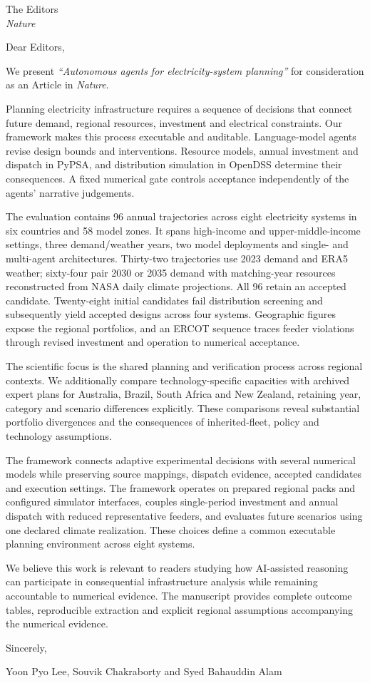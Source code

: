 \documentclass[10pt]{letter}
\begin{document}
\begin{letter}{The Editors\\\textit{Nature}}
\opening{Dear Editors,}

We present \textit{``Autonomous agents for electricity-system planning''} for consideration as an Article in \textit{Nature}.

Planning electricity infrastructure requires a sequence of decisions that connect future demand, regional resources, investment and electrical constraints. Our framework makes this process executable and auditable. Language-model agents revise design bounds and interventions. Resource models, annual investment and dispatch in PyPSA, and distribution simulation in OpenDSS determine their consequences. A fixed numerical gate controls acceptance independently of the agents' narrative judgements.

The evaluation contains 96 annual trajectories across eight electricity systems in six countries and 58 model zones. It spans high-income and upper-middle-income settings, three demand/weather years, two model deployments and single- and multi-agent architectures. Thirty-two trajectories use 2023 demand and ERA5 weather; sixty-four pair 2030 or 2035 demand with matching-year resources reconstructed from NASA daily climate projections. All 96 retain an accepted candidate. Twenty-eight initial candidates fail distribution screening and subsequently yield accepted designs across four systems. Geographic figures expose the regional portfolios, and an ERCOT sequence traces feeder violations through revised investment and operation to numerical acceptance.

The scientific focus is the shared planning and verification process across regional contexts. We additionally compare technology-specific capacities with archived expert plans for Australia, Brazil, South Africa and New Zealand, retaining year, category and scenario differences explicitly. These comparisons reveal substantial portfolio divergences and the consequences of inherited-fleet, policy and technology assumptions.

The framework connects adaptive experimental decisions with several numerical models while preserving source mappings, dispatch evidence, accepted candidates and execution settings. The framework operates on prepared regional packs and configured simulator interfaces, couples single-period investment and annual dispatch with reduced representative feeders, and evaluates future scenarios using one declared climate realization. These choices define a common executable planning environment across eight systems.

We believe this work is relevant to readers studying how AI-assisted reasoning can participate in consequential infrastructure analysis while remaining accountable to numerical evidence. The manuscript provides complete outcome tables, reproducible extraction and explicit regional assumptions accompanying the numerical evidence.

\closing{Sincerely,}
\noindent Yoon Pyo Lee, Souvik Chakraborty and Syed Bahauddin Alam
\end{letter}
\end{document}
